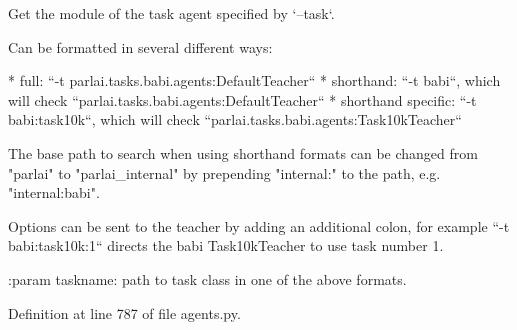 \begin{DoxyVerb}Get the module of the task agent specified by `--task`.

Can be formatted in several different ways:

* full: ``-t parlai.tasks.babi.agents:DefaultTeacher``
* shorthand: ``-t babi``, which will check
    ``parlai.tasks.babi.agents:DefaultTeacher``
* shorthand specific: ``-t babi:task10k``, which will check
    ``parlai.tasks.babi.agents:Task10kTeacher``

The base path to search when using shorthand formats can be changed from
"parlai" to "parlai_internal" by prepending "internal:" to the path, e.g.
"internal:babi".

Options can be sent to the teacher by adding an additional colon,
for example ``-t babi:task10k:1`` directs the babi Task10kTeacher to use
task number 1.

:param taskname: path to task class in one of the above formats.
\end{DoxyVerb}
 

Definition at line 787 of file agents.\+py.


